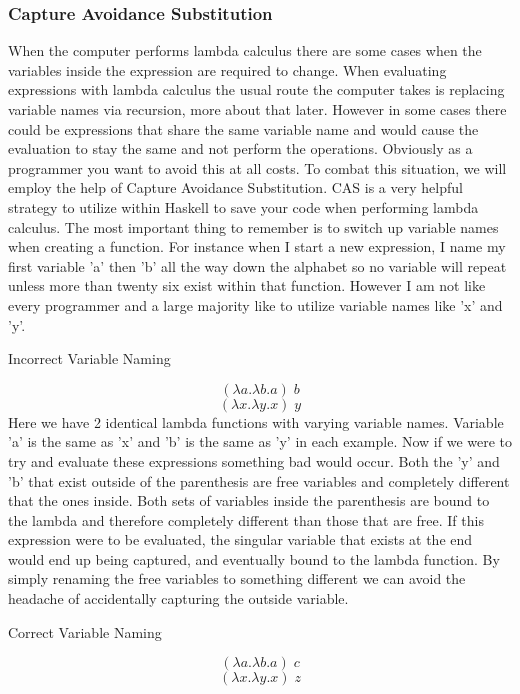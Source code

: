 \documentclass{article}
\begin{document}
        
        
        \subsubsection{Capture Avoidance Substitution}
        When the computer performs lambda calculus there are some cases when the variables inside the expression are required to change. When evaluating expressions with lambda calculus the usual route the computer takes is replacing variable names via recursion, more about that later. However in some cases there could be expressions that share the same variable name and would cause the evaluation to stay the same and not perform the operations. Obviously as a programmer you want to avoid this at all costs. To combat this situation, we will employ the help of Capture Avoidance Substitution. CAS is a very helpful strategy to utilize within Haskell to save your code when performing lambda calculus. The most important thing to remember is to switch up variable names when creating a function. For instance when I start a new expression, I name my first variable 'a' then 'b' all the way down the alphabet so no variable will repeat unless more than twenty six exist within that function. However I am not like every programmer and a large majority like to utilize variable names like 'x' and 'y'.
        
        \medskip
        \caption{Incorrect Variable Naming}
        $$(\lambda a. \lambda b. a )\; b$$
        \smallskip 
        $$(\lambda x. \lambda y. x)\; y$$
        \noindent Here we have 2 identical lambda functions with varying variable names. Variable 'a' is the same as 'x' and 'b' is the same as 'y' in each example. Now if we were to try and evaluate these expressions something bad would occur. Both the 'y' and 'b' that exist outside of the parenthesis are free variables and completely different that the ones inside. Both sets of variables inside the parenthesis are bound to the lambda and therefore completely different than those that are free. If this expression were to be evaluated, the singular variable that exists at the end would end up being captured, and eventually bound to the lambda function. By simply renaming the free variables to something different we can avoid the headache of accidentally capturing the outside variable.
        
        \medskip
        \caption{Correct Variable Naming}
        $$(\lambda a. \lambda b.a)\; c$$
        \smallskip
        $$(\lambda x. \lambda y.x) \; z$$
        
\end{document}

